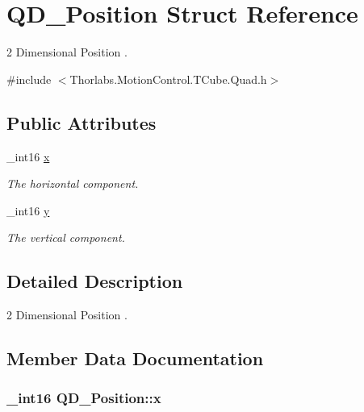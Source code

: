 \hypertarget{struct_q_d___position}{}\section{Q\+D\+\_\+\+Position Struct Reference}
\label{struct_q_d___position}


2 Dimensional Position .  




{\ttfamily \#include $<$Thorlabs.\+Motion\+Control.\+T\+Cube.\+Quad.\+h$>$}

\subsection*{Public Attributes}
\begin{DoxyCompactItemize}
\item 
\+\_\+int16 \hyperlink{struct_q_d___position_a1adc8763594904feb3625a9a85af764b}{x}
\begin{DoxyCompactList}\small\item\em The horizontal component. \end{DoxyCompactList}\item 
\+\_\+int16 \hyperlink{struct_q_d___position_a164aef28fdd78de60013683960fda0bf}{y}
\begin{DoxyCompactList}\small\item\em The vertical component. \end{DoxyCompactList}\end{DoxyCompactItemize}


\subsection{Detailed Description}
2 Dimensional Position . 



\subsection{Member Data Documentation}
\subsubsection[{\texorpdfstring{x}{x}}]{\setlength{\rightskip}{0pt plus 5cm}\+\_\+int16 Q\+D\+\_\+\+Position\+::x}\hypertarget{struct_q_d___position_a1adc8763594904feb3625a9a85af764b}{}\label{struct_q_d___position_a1adc8763594904feb3625a9a85af764b}



